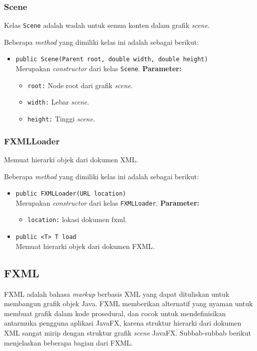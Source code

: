\subsubsection{Scene}
Kelas \texttt{Scene} adalah wadah untuk semua konten dalam grafik \textit{scene}. 

Beberapa \textit{method} yang dimiliki kelas ini adalah sebagai berikut:
\begin{itemize}
	\item \texttt{public Scene(Parent root, double width, double height)}\\
    Merupakan \textit{constructor} dari kelas \texttt{Scene}.
    \textbf{Parameter:}
	\begin{itemize}
		\item \texttt{root:} Node root dari grafik \textit{scene}.
		\item \texttt{width:} Lebar \textit{scene}.
		\item \texttt{height:} Tinggi \textit{scene}.
	\end{itemize}
\end{itemize}


\subsubsection{FXMLLoader}
Memuat hierarki objek dari dokumen XML.

Beberapa \textit{method} yang dimiliki kelas ini adalah sebagai berikut:
\begin{itemize}
	\item \texttt{public FXMLLoader(URL location)}\\
    Merupakan \textit{constructor} dari kelas \texttt{FXMLLoader}.
	\textbf{Parameter:}
	\begin{itemize}
		\item \texttt{location:} lokasi dokumen fxml.
	\end{itemize}
	
	\item \texttt{public <T> T load}\\
	Memuat hierarki objek dari dokumen FXML.
\end{itemize}

\subsection{FXML}
FXML adalah bahasa \textit{markup} berbasis XML yang dapat dituliskan untuk membangun grafik objek Java. FXML memberikan alternatif yang nyaman untuk membuat grafik dalam kode prosedural, dan cocok untuk mendefinisikan antarmuka pengguna aplikasi JavaFX, karena struktur hierarki dari dokumen XML sangat mirip dengan struktur grafik \textit{scene} JavaFX. \cite{javafx} Subbab-subbab berikut menjelaskan beberapa bagian dari FXML.


